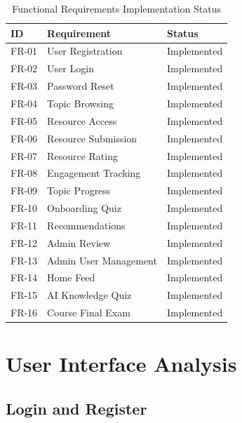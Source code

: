 \documentclass[12pt,a4paper]{report}
\begin{document}
\begin{longtable}{p{} p{} p{}}
\caption{Functional Requirements Implementation Status}\label{tab:results}\\
\toprule
\textbf{ID} & \textbf{Requirement} & \textbf{Status} \\
\midrule
FR-01 & User Registration & \textcolor{green!60!black}{Implemented} \\
FR-02 & User Login & \textcolor{green!60!black}{Implemented} \\
FR-03 & Password Reset & \textcolor{green!60!black}{Implemented} \\
FR-04 & Topic Browsing & \textcolor{green!60!black}{Implemented} \\
FR-05 & Resource Access & \textcolor{green!60!black}{Implemented} \\
FR-06 & Resource Submission & \textcolor{green!60!black}{Implemented} \\
FR-07 & Resource Rating & \textcolor{green!60!black}{Implemented} \\
FR-08 & Engagement Tracking & \textcolor{green!60!black}{Implemented} \\
FR-09 & Topic Progress & \textcolor{green!60!black}{Implemented} \\
FR-10 & Onboarding Quiz & \textcolor{green!60!black}{Implemented} \\
FR-11 & Recommendations & \textcolor{green!60!black}{Implemented} \\
FR-12 & Admin Review & \textcolor{green!60!black}{Implemented} \\
FR-13 & Admin User Management & \textcolor{green!60!black}{Implemented} \\
FR-14 & Home Feed & \textcolor{green!60!black}{Implemented} \\
FR-15 & AI Knowledge Quiz & \textcolor{green!60!black}{Implemented} \\
FR-16 & Course Final Exam & \textcolor{green!60!black}{Implemented} \\
\bottomrule
\end{longtable}

\section{User Interface Analysis}
\label{sec:results-ui}

\subsection{Login and Register}
\end{document}
